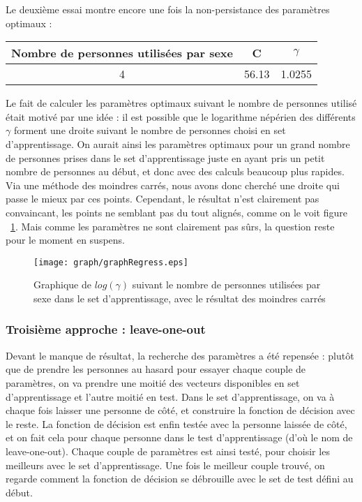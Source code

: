 Le deuxième essai montre encore une fois la non-persistance des paramètres optimaux :
\begin{center}\begin{tabular}{|c|c|c|}
\hline
Nombre de personnes utilisées par sexe & C & $\gamma$ \\
\hline
4 & 56.13 & 1.0255\\
\hline
\end{tabular}\end{center}

Le fait de calculer les paramètres optimaux suivant le nombre de personnes utilisé était motivé par une idée : il est possible que le logarithme népérien des différents $\gamma$ forment une droite suivant le nombre de personnes choisi en set d'apprentissage. On aurait ainsi les paramètres optimaux pour un grand nombre de personnes prises dans le set d'apprentissage juste en ayant pris un petit nombre de personnes au début, et donc avec des calculs beaucoup plus rapides. \\
Via une méthode des moindres carrés, nous avons donc cherché une droite qui passe le mieux par ces points. Cependant, le résultat n'est clairement pas convaincant, les points ne semblant pas du tout alignés, comme on le voit figure ~\ref{figRegress}. Mais comme les paramètres ne sont clairement pas sûrs, la question reste pour le moment en suspens.
\begin{figure}[!h]
\centering
\texttt{[image: graph/graphRegress.eps]}
\caption{Graphique de $log(\gamma)$ suivant le nombre de personnes utilisées par sexe dans le set d'apprentissage, avec le résultat des moindres carrés}
\label{figRegress}
\end{figure}

\newpage
\subsubsection{Troisième approche : leave-one-out}
Devant le manque de résultat, la recherche des paramètres a été repensée : plutôt que de prendre les personnes au hasard pour essayer chaque couple de paramètres, on va prendre une moitié des vecteurs disponibles en set d'apprentissage et l'autre moitié en test. Dans le set d'apprentissage, on va à chaque fois laisser une personne de côté, et construire la fonction de décision avec le reste. La fonction de décision est enfin testée avec la personne laissée de côté, et on fait cela pour chaque personne dans le test d'apprentissage (d'où le nom de leave-one-out). Chaque couple de paramètres est ainsi testé, pour choisir les meilleurs avec le set d'apprentissage. Une fois le meilleur couple trouvé, on regarde comment la fonction de décision se débrouille avec le set de test défini au début.

